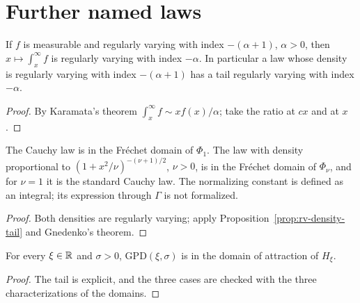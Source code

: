 \section{Further named laws}

\begin{proposition}
  \label{prop:rv-density-tail}
  \leanok
  If $f$ is measurable and regularly varying with index $-(\alpha + 1)$, $\alpha > 0$, then
  $x \mapsto \int_x^\infty f$ is regularly varying with index $-\alpha$. In particular a law whose density
  is regularly varying with index $-(\alpha + 1)$ has a tail regularly varying with index $-\alpha$.
\end{proposition}
\begin{proof}
  \leanok
  By Karamata's theorem $\int_x^\infty f \sim x f(x) / \alpha$; take the ratio at $cx$ and at $x$.
\end{proof}

\begin{proposition}
  \label{prop:cauchy-student-mda}
  \leanok
  The Cauchy law is in the Fr\'echet domain of $\Phi_1$. The law with density proportional to
  $(1 + x^2 / \nu)^{-(\nu + 1) / 2}$, $\nu > 0$, is in the Fr\'echet domain of $\Phi_\nu$, and for
  $\nu = 1$ it is the standard Cauchy law. The normalizing constant is defined as an integral; its
  expression through $\Gamma$ is not formalized.
\end{proposition}
\begin{proof}
  \leanok
  Both densities are regularly varying; apply Proposition~\ref{prop:rv-density-tail} and Gnedenko's theorem.
\end{proof}

\begin{proposition}
  \label{prop:gpd-mda}
  \leanok
  For every $\xi \in \mathbb{R}$ and $\sigma > 0$, $\mathrm{GPD}(\xi, \sigma)$ is in the domain of attraction
  of $H_\xi$.
\end{proposition}
\begin{proof}
  \leanok
  The tail is explicit, and the three cases are checked with the three characterizations of the domains.
\end{proof}

